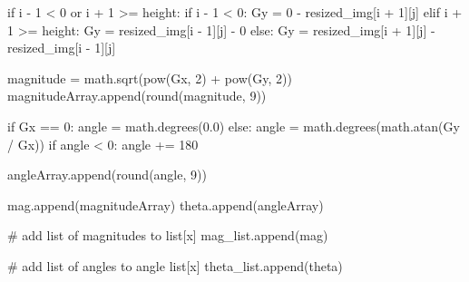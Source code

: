 \documentclass[
  letterpaper,
  DIV=11,
  numbers=noendperiod]{scrreprt}
\newenvironment{Shaded}{\begin{snugshade}}{\end{snugshade}}
\newcommand{\BuiltInTok}[1]{\textcolor[rgb]{0.00,0.23,0.31}{#1}}
\newcommand{\CommentTok}[1]{\textcolor[rgb]{0.37,0.37,0.37}{#1}}
\newcommand{\ControlFlowTok}[1]{\textcolor[rgb]{0.00,0.23,0.31}{#1}}
\newcommand{\DecValTok}[1]{\textcolor[rgb]{0.68,0.00,0.00}{#1}}
\newcommand{\FloatTok}[1]{\textcolor[rgb]{0.68,0.00,0.00}{#1}}
\newcommand{\KeywordTok}[1]{\textcolor[rgb]{0.00,0.23,0.31}{#1}}
\newcommand{\NormalTok}[1]{\textcolor[rgb]{0.00,0.23,0.31}{#1}}
\newcommand{\OperatorTok}[1]{\textcolor[rgb]{0.37,0.37,0.37}{#1}}
\begin{document}
\begin{Shaded}
\begin{Highlighting}[]
            \ControlFlowTok{if}\NormalTok{ i }\OperatorTok{{-}} \DecValTok{1} \OperatorTok{\textless{}} \DecValTok{0} \KeywordTok{or}\NormalTok{ i }\OperatorTok{+} \DecValTok{1} \OperatorTok{\textgreater{}=}\NormalTok{ height:}
                \ControlFlowTok{if}\NormalTok{ i }\OperatorTok{{-}} \DecValTok{1} \OperatorTok{\textless{}} \DecValTok{0}\NormalTok{:}
\NormalTok{                    Gy }\OperatorTok{=} \DecValTok{0} \OperatorTok{{-}}\NormalTok{ resized\_img[i }\OperatorTok{+} \DecValTok{1}\NormalTok{][j]}
                \ControlFlowTok{elif}\NormalTok{ i }\OperatorTok{+} \DecValTok{1} \OperatorTok{\textgreater{}=}\NormalTok{ height:}
\NormalTok{                    Gy }\OperatorTok{=}\NormalTok{ resized\_img[i }\OperatorTok{{-}} \DecValTok{1}\NormalTok{][j] }\OperatorTok{{-}} \DecValTok{0}
            \ControlFlowTok{else}\NormalTok{:}
\NormalTok{                Gy }\OperatorTok{=}\NormalTok{ resized\_img[i }\OperatorTok{+} \DecValTok{1}\NormalTok{][j] }\OperatorTok{{-}}\NormalTok{ resized\_img[i }\OperatorTok{{-}} \DecValTok{1}\NormalTok{][j]}

\NormalTok{            magnitude }\OperatorTok{=}\NormalTok{ math.sqrt(}\BuiltInTok{pow}\NormalTok{(Gx, }\DecValTok{2}\NormalTok{) }\OperatorTok{+} \BuiltInTok{pow}\NormalTok{(Gy, }\DecValTok{2}\NormalTok{))}
\NormalTok{            magnitudeArray.append(}\BuiltInTok{round}\NormalTok{(magnitude, }\DecValTok{9}\NormalTok{))}

            \ControlFlowTok{if}\NormalTok{ Gx }\OperatorTok{==} \DecValTok{0}\NormalTok{:}
\NormalTok{                angle }\OperatorTok{=}\NormalTok{ math.degrees(}\FloatTok{0.0}\NormalTok{)}
            \ControlFlowTok{else}\NormalTok{:}
\NormalTok{                angle }\OperatorTok{=}\NormalTok{ math.degrees(math.atan(Gy }\OperatorTok{/}\NormalTok{ Gx))}
                \ControlFlowTok{if}\NormalTok{ angle }\OperatorTok{\textless{}} \DecValTok{0}\NormalTok{:}
\NormalTok{                    angle }\OperatorTok{+=} \DecValTok{180}

\NormalTok{            angleArray.append(}\BuiltInTok{round}\NormalTok{(angle, }\DecValTok{9}\NormalTok{))}

\NormalTok{        mag.append(magnitudeArray)}
\NormalTok{        theta.append(angleArray)}

    \CommentTok{\# add list of magnitudes to list[x]}
\NormalTok{    mag\_list.append(mag)}

    \CommentTok{\# add list of angles to angle list[x]}
\NormalTok{    theta\_list.append(theta)}
\end{Highlighting}
\end{Shaded}
\end{document}
